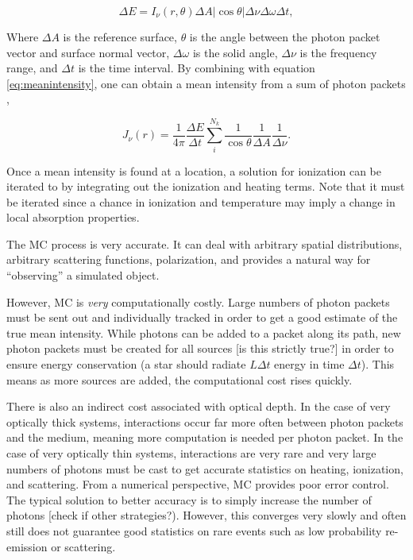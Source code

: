 \begin{equation}
\label{eq:mcstimator}
\Delta E = I_{\nu}(r,\theta)\Delta A |\cos{\theta}|\Delta \nu \Delta \omega \Delta t,
\end{equation}

Where $\Delta A$ is the reference surface, $\theta$ is the angle between the photon packet vector and surface normal vector, $\Delta \omega$ is the solid angle, $\Delta \nu$ is the frequency range, and $\Delta t$ is the time interval. By combining with equation \ref{eq:meanintensity}, one can obtain a mean intensity from a sum of photon packets \citep{ercolanoEt03},

\begin{equation}
\label{eq:mcmeanintensity}
J_{\nu}(r) = \frac{1}{4\pi}\frac{\Delta E}{\Delta t} \sum_i^{N_k} \frac{1}{\cos{\theta}}\frac{1}{\Delta A}\frac{1}{\Delta \nu}.
\end{equation}

Once a mean intensity is found at a location, a solution for ionization can be iterated to by integrating out the ionization and heating terms. Note that it must be iterated since a chance in ionization and temperature may imply a change in local absorption properties.

The MC process is very accurate. It can deal with arbitrary spatial distributions, arbitrary scattering functions, polarization, and provides a natural way for ``observing'' a simulated object.

However, MC is \emph{very} computationally costly. Large numbers of photon packets must be sent out and individually tracked in order to get a good estimate of the true mean intensity. While photons can be added to a packet along its path, new photon packets must be created for all sources [is this strictly true?] in order to ensure energy conservation (a star should radiate $L\Delta t$ energy in time $\Delta t$). This means as more sources are added, the computational cost rises quickly.

There is also an indirect cost associated with optical depth. In the case of very optically thick systems, interactions occur far more often between photon packets and the medium, meaning more computation is needed per photon packet. In the case of very optically thin systems, interactions are very rare and very large numbers of photons must be cast to get accurate statistics on heating, ionization, and scattering. From a numerical perspective, MC provides poor error control. The typical solution to better accuracy is to simply increase the number of photons [check if other strategies?). However, this converges very slowly and often still does not guarantee good statistics on rare events such as low probability re-emission or scattering.

